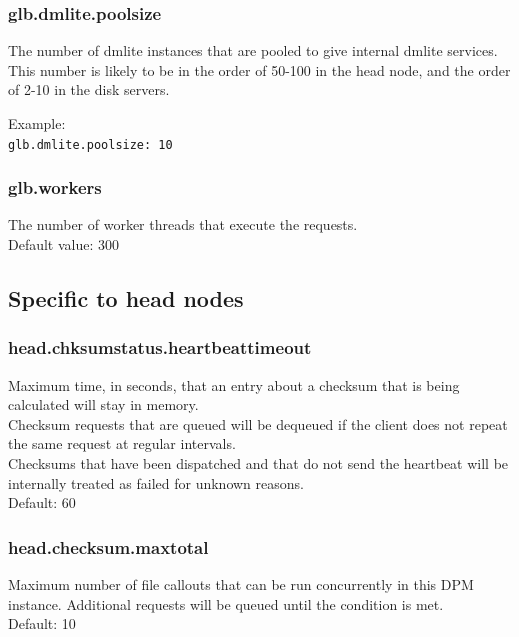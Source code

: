\documentclass[a4paper,10pt]{scrreprt}
\begin{document}
\subsubsection{glb.dmlite.poolsize}

The number of dmlite instances that are pooled to give internal dmlite services. This number is likely to be in the order of 50-100 in the head node, and the order of 2-10 in the disk servers.

 Example:\\
\lstinline"glb.dmlite.poolsize: 10"\\

\subsubsection{glb.workers}

The number of worker threads that execute the requests.\\
Default value: 300\\




\subsection{Specific to head nodes}

\subsubsection{head.chksumstatus.heartbeattimeout}
Maximum time, in seconds, that an entry about a checksum that is being calculated will stay in memory.\\
Checksum requests that are queued will be dequeued if the client does not repeat the same request at regular intervals.\\
Checksums that have been dispatched and that do not send the heartbeat will be internally treated as failed for unknown reasons.\\
Default: 60\\

\subsubsection{head.checksum.maxtotal}

Maximum number of file callouts that can be run concurrently in this DPM instance. Additional requests will be queued until the condition is met.\\
Default: 10\\
\end{document}
